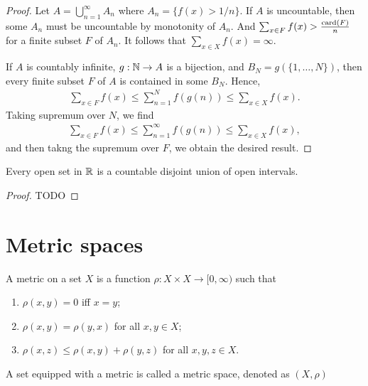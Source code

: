 \begin{proof}
    Let $A = \bigcup_{n=1}^{\infty} A_n$ where $A_n = \{ f(x) > 1/n \}$.
    If $A$ is uncountable, then some $A_n$ must be uncountable by monotonity of $A_n$.
    And $\sum_{x \in F} f(x) > \frac{\mathrm{card} (F)}{n}$ for a finite subset $F$ of $A_n$.
    It follows that $\sum_{x \in X} f(x) = \infty$.

    If $A$ is countably infinite, $g: \mathbb{N} \to A$ is a bijection, and $B_N = g(\{ 1, \dots, N \})$, then every finite subset $F$ of $A$ is contained in some $B_N$.
    Hence, 
    \begin{align}
        \sum_{x \in F} f(x) \le \sum_{n=1}^{N} f(g(n)) \le \sum_{x \in X} f(x).
    \end{align}
    Taking supremum over $N$, we find
    \begin{align}
        \sum_{x \in F} f(x) \le \sum_{n=1}^{\infty} f(g(n)) \le \sum_{x \in X} f(x),
    \end{align}
    and then takng the supremum over $F$, we obtain the desired result. 
\end{proof}

\begin{proposition}
    Every open set in $\mathbb{R}$ is a countable disjoint union of open intervals.
\end{proposition}

\begin{proof}
    TODO
\end{proof}

\section{Metric spaces}

\begin{definition}
    A metric on a set $X$ is a function $\rho : X \times X \to [0, \infty)$ such that
    \begin{enumerate}
        \item $\rho(x, y) = 0$ iff $x = y$;
        \item $\rho(x, y) = \rho(y, x)$ for all $x, y \in X$;
        \item $\rho(x, z) \le \rho (x, y) + \rho(y, z)$ for all $x, y, z \in X$.
    \end{enumerate}
    A set equipped with a metric is called a metric space, denoted as $(X, \rho)$
\end{definition}

